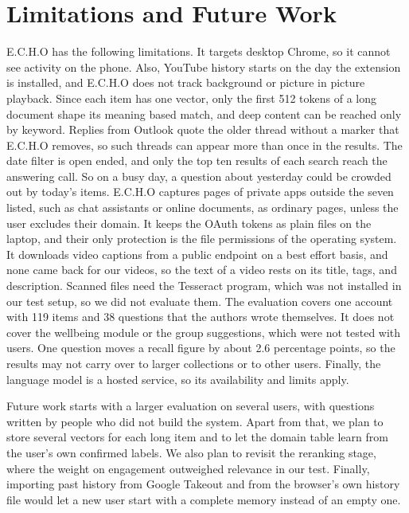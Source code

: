 \documentclass[conference]{IEEEtran}
\begin{document}
\section{Limitations and Future Work}\label{sec:limits}
E.C.H.O has the following limitations. It targets desktop Chrome, so it cannot see activity on the phone. Also, YouTube history starts on the day the extension is installed, and E.C.H.O does not track background or picture in picture playback. Since each item has one vector, only the first 512 tokens of a long document shape its meaning based match, and deep content can be reached only by keyword. Replies from Outlook quote the older thread without a marker that E.C.H.O removes, so such threads can appear more than once in the results. The date filter is open ended, and only the top ten results of each search reach the answering call. So on a busy day, a question about yesterday could be crowded out by today's items. E.C.H.O captures pages of private apps outside the seven listed, such as chat assistants or online documents, as ordinary pages, unless the user excludes their domain. It keeps the OAuth tokens as plain files on the laptop, and their only protection is the file permissions of the operating system. It downloads video captions from a public endpoint on a best effort basis, and none came back for our videos, so the text of a video rests on its title, tags, and description. Scanned files need the Tesseract program, which was not installed in our test setup, so we did not evaluate them. The evaluation covers one account with 119 items and 38 questions that the authors wrote themselves. It does not cover the wellbeing module or the group suggestions, which were not tested with users. One question moves a recall figure by about 2.6 percentage points, so the results may not carry over to larger collections or to other users. Finally, the language model is a hosted service, so its availability and limits apply.

Future work starts with a larger evaluation on several users, with questions written by people who did not build the system. Apart from that, we plan to store several vectors for each long item and to let the domain table learn from the user's own confirmed labels. We also plan to revisit the reranking stage, where the weight on engagement outweighed relevance in our test. Finally, importing past history from Google Takeout and from the browser's own history file would let a new user start with a complete memory instead of an empty one.
\end{document}

